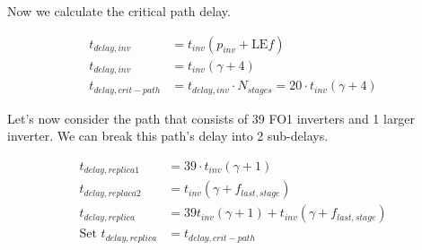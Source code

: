 \documentclass[11pt]{article}
\begin{document}
Now we calculate the critical path delay.

\begin{align}
	t_{delay,inv} &= t_{inv}(p_{inv} + \text{LE} f) \nonumber \\
	t_{delay,inv} &= t_{inv}(\gamma + 4) \nonumber \\
	t_{delay,crit-path} &= t_{delay,inv}  \cdot N_{stages} = 20 \cdot t_{inv}(\gamma + 4) \nonumber
\end{align}

Let's now consider the path that consists of 39 FO1 inverters and 1 larger inverter. We can break this path's delay into 2 sub-delays.

\begin{align}
	t_{delay,replica1} &= 39 \cdot t_{inv}(\gamma + 1) \nonumber \\
	t_{delay,replaca2} &= t_{inv}(\gamma + f_{last,stage}) \nonumber \\
	t_{delay,replica} &= 39 t_{inv}(\gamma + 1) + t_{inv}(\gamma + f_{last,stage}) \nonumber \\
	\text{Set } t_{delay,replica} &= t_{delay,crit-path} \nonumber 
\end{align}

\newpage
\appendix
\end{document}
